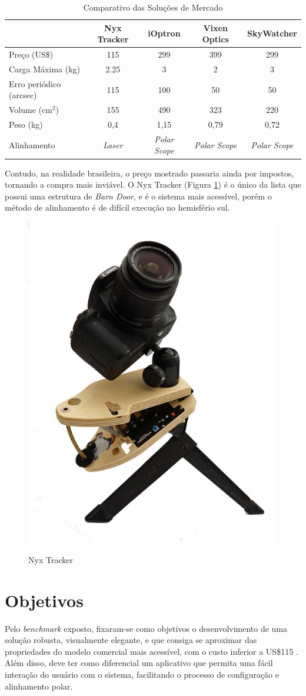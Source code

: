 
\begin{table}[htb]
	\caption{Comparativo das Soluções de Mercado}
	\begin{tabular}{l|cccc}
		& Nyx Tracker & iOptron & Vixen Optics & SkyWatcher \\ \hline
		Preço (US\$) & 115 & 299 & 399 & 299 \\\hline
		Carga Máxima (kg) & 2.25 & 3 & 2 & 3 \\\hline
		Erro periódico (arcsec) & 115 & 100 & 50 & 50 \\\hline
		Volume (cm$^2$) & 155 & 490 & 323 & 220 \\\hline
		Peso (kg) & 0,4 & 1,15 & 0,79 & 0,72 \\\hline
		Alinhamento & \textit{Laser} & \textit{Polar Scope} & \textit{Polar Scope} & \textit{Polar Scope} \\
	\end{tabular}
	\label{tabela_benchmark}
\end{table}

Contudo, na realidade brasileira, o preço mostrado passaria ainda por impostos, tornando a compra mais inviável. O Nyx Tracker (Figura \ref{fig:nyxtracker}) é o único da lista que possui uma estrutura de \textit{Barn Door}, e é o sistema mais acessível, porém o método de alinhamento é de difícil execução no hemisfério sul.

\begin{figure}[h]
	\centering
	\caption{Nyx Tracker}
	\includegraphics[width=0.3\linewidth]{figuras/nyxtracker}
	\label{fig:nyxtracker}
\end{figure}


\section{Objetivos}

Pelo \textit{benchmark} exposto, fixaram-se como objetivos o desenvolvimento de uma solução robusta, visualmente elegante, e que consiga se aproximar das propriedades do modelo comercial mais acessível, com o custo inferior a US\$115 . Além disso, deve ter como diferencial um aplicativo que permita uma fácil interação do usuário com o sistema, facilitando o processo de configuração e alinhamento polar.

